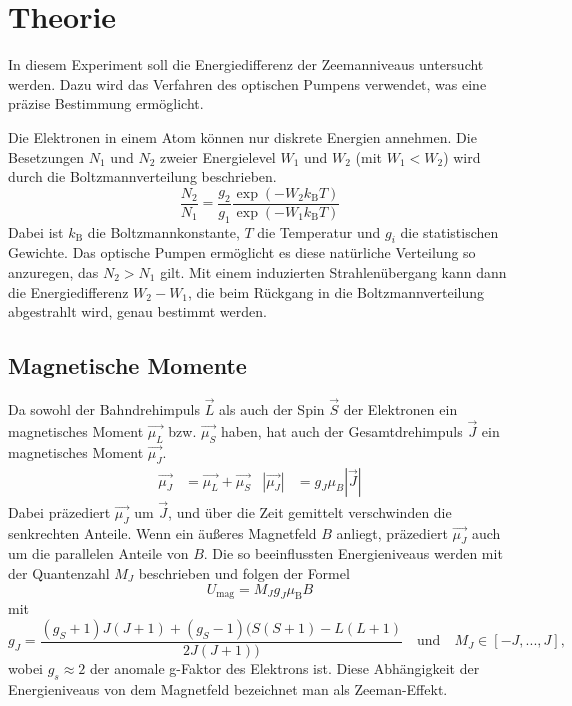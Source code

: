 \section{Theorie}
\label{sec:Theorie}
In diesem Experiment soll die Energiedifferenz der Zeemanniveaus untersucht werden. Dazu wird das Verfahren des optischen Pumpens verwendet, was eine präzise Bestimmung ermöglicht.

Die Elektronen in einem Atom können nur diskrete Energien annehmen. Die Besetzungen $N_1$ und $N_2$  zweier Energielevel $W_1$ und $W_2$ (mit $W_1<W_2$) wird durch die Boltzmannverteilung beschrieben.
\begin{equation}
	\frac{N_2}{N_1}=\frac{g_2}{g_1}\frac{\exp(-W_2k_\text{B}T)}{\exp(-W_1k_\text{B}T)}
	\label{eqn:Boltzmann}
\end{equation}
Dabei ist $k_\text{B}$ die Boltzmannkonstante, $T$ die Temperatur und $g_i$ die statistischen Gewichte. Das optische Pumpen ermöglicht es diese natürliche Verteilung so anzuregen, das $N_2 > N_1$ gilt. Mit einem induzierten Strahlenübergang kann dann die Energiedifferenz $W_2-W_1$, die beim Rückgang in die Boltzmannverteilung abgestrahlt wird, genau bestimmt werden.
\subsection{Magnetische Momente}
Da sowohl der Bahndrehimpuls $\vec{L}$ als auch der Spin $\vec{S}$ der Elektronen ein magnetisches Moment $\vec{\mu_L}$ bzw. $\vec{\mu_S}$ haben, hat auch der Gesamtdrehimpuls  $\vec{J}$ ein magnetisches Moment $\vec{\mu_J}$.
\begin{align}
	\vec{\mu_J}&=\vec{\mu_L} +\vec{\mu_S} & \left| \vec{\mu_J} \right|&=g_J\mu_B\left| \vec{J} \right|
\end{align}
Dabei präzediert $\vec{\mu_J}$ um $\vec{J}$, und über die Zeit gemittelt verschwinden die senkrechten Anteile.
Wenn ein äußeres Magnetfeld $B$ anliegt, präzediert $\vec{\mu_J}$ auch um die parallelen Anteile von $B$. Die so beeinflussten Energieniveaus werden mit der Quantenzahl $M_J$ beschrieben und folgen der Formel
\begin{equation}
	U_\text{mag} = M_J g_J \mu_\text{B}B
	\label{ABC}
\end{equation}
mit
\begin{equation}
	g_J = \frac{(g_S+1)J(J+1)+(g_S-1)(S(S+1)-L(L+1)}{2J(J+1))} \quad \text{und}\quad M_J \in [-J,...,J],
	\label{GHI}
\end{equation}
wobei $g_s \approx 2$ der anomale g-Faktor des Elektrons ist. Diese Abhängigkeit der Energieniveaus von dem Magnetfeld bezeichnet man als Zeeman-Effekt.
